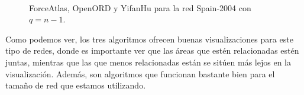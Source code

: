 \documentclass[paper=a4, fontsize=11pt]{article} %
\numberwithin{equation}{section} %
\numberwithin{figure}{section} %
\numberwithin{table}{section} %
\begin{document}
\begin{figure}[H]
    \centering
    \mbox {
      \qquad
    }
    \mbox{
    }
    \caption{ForceAtlas, OpenORD y YifanHu para la red Spain-2004 con $q=n-1$.}
    \label{sp2004v2}
\end{figure}

Como podemos ver, los tres algoritmos ofrecen buenas visualizaciones para este tipo de redes, donde es importante ver que las áreas que estén relacionadas estén juntas, mientras que las que menos relacionadas están se sitúen más lejos en la visualización. Además, son algoritmos que funcionan bastante bien para el tamaño de red que estamos utilizando.
\end{document}
